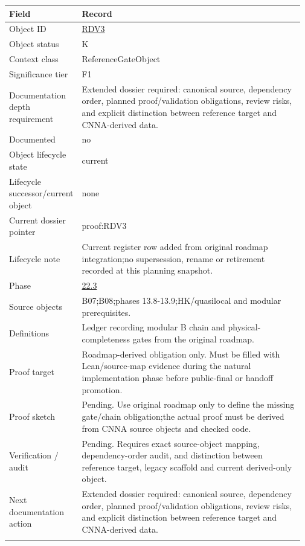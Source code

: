\begin{longtable}{L{0.16\linewidth} L{0.81\linewidth}}
\hline
\textbf{Field} & \textbf{Record}\\
\hline
Object ID & \hyperlink{object-row-RDV3}{RDV3}\\
\hline\addlinespace[0.20em]
Object status & K\\
\hline\addlinespace[0.20em]
Context class & ReferenceGateObject\\
\hline\addlinespace[0.20em]
Significance tier & F1\\
\hline\addlinespace[0.20em]
Documentation depth requirement & Extended dossier required: canonical source, dependency order, planned proof/\allowbreak{}validation obligations, review risks, and explicit distinction between reference target and CNNA-derived data.\\
\hline\addlinespace[0.20em]
Documented & no\\
\hline\addlinespace[0.20em]
Object lifecycle state & current\\
\hline\addlinespace[0.20em]
Lifecycle successor/\allowbreak{}current object & none\\
\hline\addlinespace[0.20em]
Current dossier pointer & proof:RDV3\\
\hline\addlinespace[0.20em]
Lifecycle note & Current register row added from original roadmap integration;\newline no supersession, rename or retirement recorded at this planning snapshot.\\
\hline\addlinespace[0.20em]
Phase & \hyperlink{phase-row-22-3}{22.3}\\
\hline\addlinespace[0.20em]
Source objects & B07;\newline B08;\newline phases 13.8-13.9;\newline HK/\allowbreak{}quasilocal and modular prerequisites.\\
\hline\addlinespace[0.20em]
Definitions & Ledger recording modular B chain and physical-completeness gates from the original roadmap.\\
\hline\addlinespace[0.20em]
Proof target & Roadmap-derived obligation only. Must be filled with Lean/\allowbreak{}source-map evidence during the natural implementation phase before public-final or handoff promotion.\\
\hline\addlinespace[0.20em]
Proof sketch & Pending. Use original roadmap only to define the missing gate/\allowbreak{}chain obligation;\newline the actual proof must be derived from CNNA source objects and checked code.\\
\hline\addlinespace[0.20em]
Verification /\allowbreak{} audit & Pending. Requires exact source-object mapping, dependency-order audit, and distinction between reference target, legacy scaffold and current derived-only object.\\
\hline\addlinespace[0.20em]
Next documentation action & Extended dossier required: canonical source, dependency order, planned proof/\allowbreak{}validation obligations, review risks, and explicit distinction between reference target and CNNA-derived data.\\
\hline\addlinespace[0.20em]
\end{longtable}
